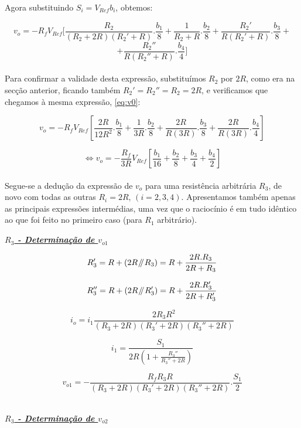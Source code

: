 \documentclass[a4paper,11pt]{report}
\newcommand{\parallelsum}{\mathbin{\!/\mkern-5mu/\!}} %
\begin{document}
Agora substituindo $S_i=V_{Ref}b_i$, obtemos:


$$v_o=-R_fV_{Ref}\Bigg[\frac{R_2}{\left(R_2+2R\right)\left(R_2'+R\right)}.\frac{b_1}{8}+\frac{1}{R_2+R}.\frac{b_2}{8}+\frac{R_2'}{R\left(R_2'+R\right)}.\frac{b_3}{8}+$$
\begin{equation}\label{eq:v0_2}
+\frac{R_2''}{R\left(R_2''+R\right)}.\frac{b_4}{4}\Bigg]
\end{equation}\\

Para confirmar a validade desta expressão, substituímos $R_2$ por $2R$, como era na secção anterior, ficando também $R_2'=R_2''=R_2=2R$, e verificamos que chegamos à mesma expressão, \ref{eq:v0}:

$$v_o=-R_fV_{Ref}\left[\frac{2R}{12R^2}.\frac{b_1}{8}+\frac{1}{3R}.\frac{b_2}{8}+\frac{2R}{R\left(3R\right)}.\frac{b_3}{8}+\frac{2R}{R\left(3R\right)}.\frac{b_4}{4}\right]$$

$$\Leftrightarrow v_o=-\frac{R_f}{3R}V_{Ref}\left[\frac{b_1}{16}+\frac{b_2}{8}+\frac{b_3}{4}+\frac{b_4}{2}\right]$$\\

Segue-se a dedução da expressão de $v_o$ para uma resistência arbitrária $R_3$, de novo com todas as outras $R_i=2R$, $\left(i=2,3,4\right)$. Apresentamos também apenas as principais expressões intermédias, uma vez que o raciocínio é em tudo idêntico ao que foi feito no primeiro caso (para $R_1$ arbitrário).\\

\par

\large\underline{\textit{\textbf{$R_3$ - Determinação de $v_{o1}$}}}\\
\par

$$R_3'=R+\left(2R\parallelsum R_3\right)=R+\frac{2R.R_3}{2R+R_3}$$

$$R_3''=R+\left(2R\parallelsum R_3'\right)=R+\frac{2R.R_3'}{2R+R_3'}$$

$$i_o=i_1\frac{2R_3R^2}{\left(R_3+2R\right)\left(R_3'+2R\right)\left(R_3''+2R\right)}$$

$$i_1=\frac{S_1}{2R\left(1+\frac{R_3''}{R_3''+2R}\right)}$$

$$v_{o1}=-\frac{R_fR_3R}{\left(R_3+2R\right)\left(R_3'+2R\right)\left(R_3''+2R\right)}.\frac{S_1}{2}$$\\

\par

\large\underline{\textit{\textbf{$R_3$ - Determinação de $v_{o2}$}}}\\
\par
\end{document}
